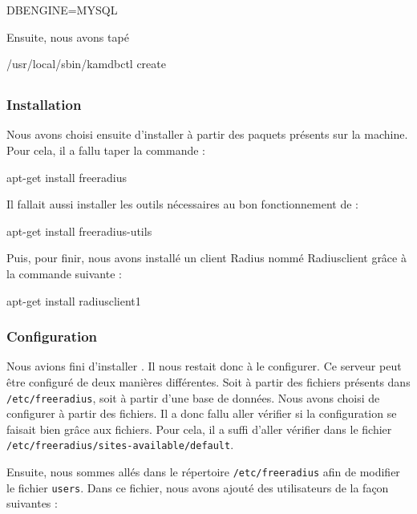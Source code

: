 DBENGINE=MYSQL

Ensuite, nous avons tapé 
\begin{shell}
/usr/local/sbin/kamdbctl create
\end{shell}
\todo

\subsection{\frad}
\subsubsection{Installation}

Nous avons choisi ensuite d'installer {\frad} à partir des paquets présents sur la machine. Pour cela, il a fallu taper la commande :

\begin{shell}
apt-get install freeradius
\end{shell}

Il fallait aussi installer les outils nécessaires au bon fonctionnement de {\frad} :

\begin{shell}
apt-get install freeradius-utils
\end{shell}

Puis, pour finir, nous avons installé un client Radius nommé Radiusclient grâce à la commande suivante :

\begin{shell}
apt-get install radiusclient1
\end{shell}

\subsubsection{Configuration}
Nous avions fini d'installer {\frad}. Il nous restait donc à le configurer. Ce serveur {\rad} peut être configuré de deux manières différentes. Soit à partir des fichiers présents dans \texttt{/etc/freeradius}, soit à partir d'une base de données. Nous avons choisi de configurer à partir des fichiers. Il a donc fallu aller vérifier si la configuration se faisait bien grâce aux fichiers. Pour cela, il a suffi d'aller vérifier dans le fichier \texttt{/etc/freeradius/sites-available/default}.

Ensuite, nous sommes allés dans le répertoire \texttt{/etc/freeradius} afin de modifier le fichier \texttt{users}. Dans ce fichier, nous avons ajouté des utilisateurs de la façon suivantes :


